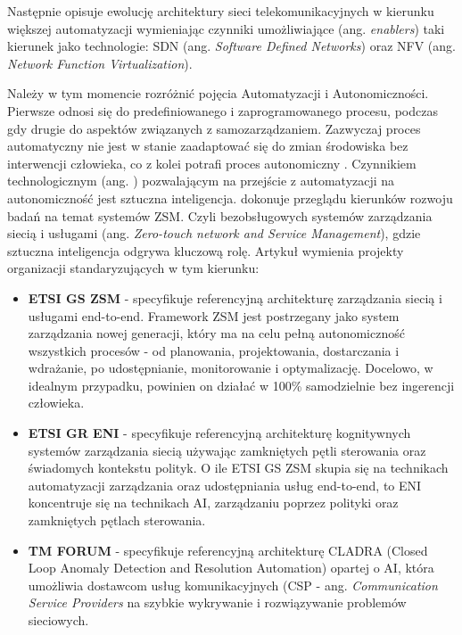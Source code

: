 Następnie \cite{doyle2014} opisuje ewolucję architektury sieci telekomunikacyjnych w kierunku większej automatyzacji wymieniając czynniki umożliwiające (ang. \textit{enablers}) taki kierunek jako technologie: SDN (ang. \textit{Software Defined Networks}) oraz NFV (ang. \textit{Network Function Virtualization}).

Należy w tym momencie rozróżnić pojęcia Automatyzacji i Autonomiczności. Pierwsze odnosi się do predefiniowanego i zaprogramowanego procesu, podczas gdy drugie do aspektów związanych z samozarządzaniem. Zazwyczaj proces automatyczny nie jest w stanie zaadaptować się do zmian środowiska bez interwencji człowieka, co z kolei potrafi proces autonomiczny \cite{ngmn2022}. Czynnikiem technologicznym (ang. ) pozwalającym na przejście z automatyzacji na autonomiczność jest sztuczna inteligencja. \cite{benzaid2020} dokonuje przeglądu kierunków rozwoju badań na temat systemów ZSM. Czyli bezobsługowych systemów zarządzania siecią i usługami (ang. \textit{Zero-touch network and Service Management}), gdzie sztuczna inteligencja odgrywa kluczową rolę. Artykuł wymienia projekty organizacji standaryzujących w tym kierunku:
\begin{itemize}
    \item \textbf{ETSI GS ZSM} - specyfikuje referencyjną architekturę zarządzania siecią i usługami end-to-end. Framework ZSM jest postrzegany jako system zarządzania nowej generacji, który ma na celu pełną autonomiczność wszystkich procesów - od planowania, projektowania, dostarczania i wdrażanie, po udostępnianie, monitorowanie i optymalizację. Docelowo, w idealnym przypadku, powinien on działać w 100\% samodzielnie bez ingerencji człowieka. 
    \item \textbf{ETSI GR ENI} - specyfikuje referencyjną architekturę kognitywnych systemów zarządzania siecią używając zamkniętych pętli sterowania oraz świadomych kontekstu polityk. O ile ETSI GS ZSM skupia się na technikach automatyzacji zarządzania oraz udostępniania usług end-to-end, to ENI koncentruje się na technikach AI, zarządzaniu poprzez polityki oraz zamkniętych pętlach sterowania.
    \item \textbf{TM FORUM} - specyfikuje referencyjną architekturę CLADRA (Closed Loop Anomaly Detection and Resolution Automation) opartej o AI, która umożliwia dostawcom usług komunikacyjnych (CSP - ang. \textit{Communication Service Providers} na szybkie wykrywanie i rozwiązywanie problemów sieciowych.
\end{itemize}

